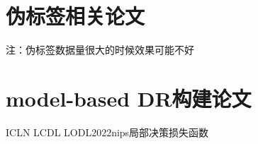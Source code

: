 \documentclass{article}
\begin{document}
\section{伪标签相关论文}
注：伪标签数据量很大的时候效果可能不好

\section{model-based DR构建论文}
ICLN\cite{jeon2024icln}
LCDL\cite{jeon2025locally}
LODL\cite{shah2022decision}2022nips局部决策损失函数


\end{document}
